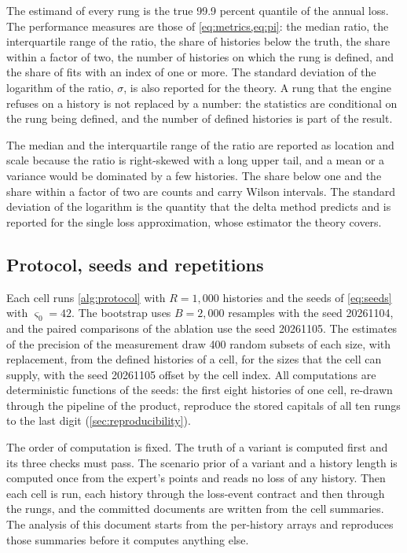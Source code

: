 The estimand of every rung is the true 99.9 percent quantile of the annual loss. The performance measures are those of \cref{eq:metrics,eq:pi}: the median ratio, the interquartile range of the ratio, the share of histories below the truth, the share within a factor of two, the number of histories on which the rung is defined, and the share of fits with an index of one or more. The standard deviation of the logarithm of the ratio, $\sigma$, is also reported for the theory. A rung that the engine refuses on a history is not replaced by a number: the statistics are conditional on the rung being defined, and the number of defined histories is part of the result.

The median and the interquartile range of the ratio are reported as location and scale because the ratio is right-skewed with a long upper tail, and a mean or a variance would be dominated by a few histories. The share below one and the share within a factor of two are counts and carry Wilson intervals. The standard deviation of the logarithm is the quantity that the delta method predicts and is reported for the single loss approximation, whose estimator the theory covers.

\subsection{Protocol, seeds and repetitions}
\label{sec:ed-protocol}

Each cell runs \cref{alg:protocol} with $R=1{,}000$ histories and the seeds of \cref{eq:seeds} with $\varsigma_0=42$. The bootstrap uses $B=2{,}000$ resamples with the seed 20261104, and the paired comparisons of the ablation use the seed 20261105. The estimates of the precision of the measurement draw 400 random subsets of each size, with replacement, from the defined histories of a cell, for the sizes that the cell can supply, with the seed 20261105 offset by the cell index. All computations are deterministic functions of the seeds: the first eight histories of one cell, re-drawn through the pipeline of the product, reproduce the stored capitals of all ten rungs to the last digit (\cref{sec:reproducibility}).

The order of computation is fixed. The truth of a variant is computed first and its three checks must pass. The scenario prior of a variant and a history length is computed once from the expert's points and reads no loss of any history. Then each cell is run, each history through the loss-event contract and then through the rungs, and the committed documents are written from the cell summaries. The analysis of this document starts from the per-history arrays and reproduces those summaries before it computes anything else.

